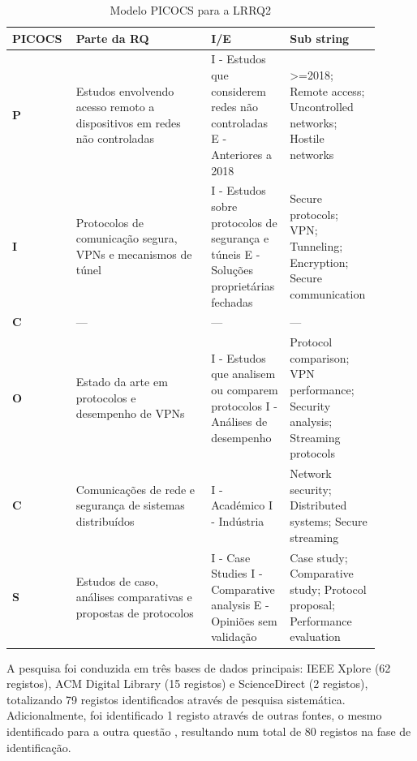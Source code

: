 \begin{table}[H]
	\centering
	\caption{Modelo PICOCS para a LRRQ2}
	\label{tab:lrrq2_picocs}
	\begin{tabular}{p{0.15\linewidth}p{0.35\linewidth}p{0.2\linewidth}p{0.2\linewidth}}
		\toprule
		\textbf{PICOCS} & \textbf{Parte da RQ} & \textbf{I/E} & \textbf{Sub string} \\
		\midrule
		\textbf{P}  & Estudos envolvendo acesso remoto a dispositivos em redes não controladas & I - Estudos que considerem redes não controladas \newline E - Anteriores a 2018 & >=2018; Remote access; Uncontrolled networks; Hostile networks \\
		\textbf{I}  & Protocolos de comunicação segura, \glspl{VPN} e mecanismos de túnel & I - Estudos sobre protocolos de segurança e túneis \newline E - Soluções proprietárias fechadas & Secure protocols; VPN; Tunneling; Encryption; Secure communication \\
		\textbf{C}  & --- & --- & --- \\
		\textbf{O} & Estado da arte em protocolos e desempenho de \glspl{VPN} & I - Estudos que analisem ou comparem protocolos \newline I - Análises de desempenho & Protocol comparison; VPN performance; Security analysis; Streaming protocols \\
		\textbf{C} & Comunicações de rede e segurança de sistemas distribuídos & I - Académico \newline I - Indústria & Network security; Distributed systems; Secure streaming \\
		\textbf{S}  & Estudos de caso, análises comparativas e propostas de protocolos & I - Case Studies \newline I - Comparative analysis \newline E - Opiniões sem validação & Case study; Comparative study; Protocol proposal; Performance evaluation \\
		\bottomrule
	\end{tabular}
\end{table}




A pesquisa foi conduzida em três bases de dados principais: IEEE Xplore (62 registos), ACM Digital Library (15 registos) e ScienceDirect (2 registos), totalizando 79 registos identificados através de pesquisa sistemática. Adicionalmente, foi identificado 1 registo através de outras fontes, o mesmo identificado para a outra questão \cite{resende_sistema_2025}, resultando num total de 80 registos na fase de identificação.

